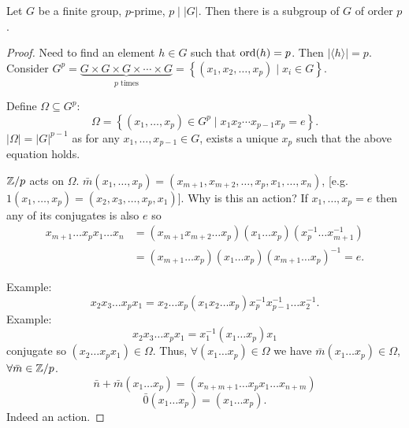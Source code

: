 \documentclass[10pt, a4paper]{article}
\begin{document}
\begin{theorem}[Cauchy]
    Let $G$ be a finite group,
    $p$-prime,
    $p \mid |G|$.
    Then there is a subgroup of $G$ of order $p$.

    \begin{proof}
        Need to find an element $h \in G$ such that $\operatorname{ord}(h) = p$.
        Then $|\langle h \rangle| = p$.
        Consider $G ^ p = \underbrace{G \times G \times G \times \dotsi \times G}_{p\text{ times}} = \left\{(x_1, x_2, \dotsc, x_p) \mid x_i \in G\right\}$.

        Define $\Omega \subseteq G ^ p$:
        \[
        \Omega = \left\{(x_1, \dotsc, x_p) \in G ^ p \mid x_1x_2\dotsi x_{p - 1}x_p = e\right\}.
        \]
        $|\Omega| = |G| ^ {p - 1}$ as for any $x_1, \dotsc, x_{p - 1} \in G$,
        exists a unique $x_p$ such that the above equation holds.

        $\mathbb{Z} / p$ acts on $\Omega$.
        $\bar{m}(x_1, \dotsc, x_p) = (x_{m + 1}, x_{m + 2}, \dotsc, x_p, x_1, \dotsc, x_n)$,
        [e.g. $1(x_1, \dotsc, x_p) = (x_2, x_3, \dotsc, x_p, x_1)$].
        Why is this an action?
        If $x_1, \dotsc, x_p = e$ then any of its conjugates is also $e$ so
        \begin{align*}
            x_{m + 1} \dotsc x_px_1 \dotsc x_n &= (x_{m + 1}x_{m + 2}\dotsc x_p)(x_1 \dotsc x_p)(x_p ^ {-1}\dotsc x_{m + 1}^{-1}) \\
            &= (x_{m + 1}\dotsc x_p)(x_1\dotsc x_p)(x_{m + 1}\dotsc x_p) ^ {-1} = e.
        \end{align*}
        
        Example:
        \[
        x_2x_3 \dotsc x_px_1 = x_2\dotsc x_p(x_1x_2\dotsc x_p)x_p ^ {-1}x_{p - 1}^{-1}\dotsc x_2 ^ {-1}.
        \]
        Example:
        \[
        x_2x_3\dotsc x_px_1 = x_1 ^ {-1}(x_1\dotsc x_p)x_1
        \]
        conjugate so $(x_2\dotsc x_px_1) \in \Omega$.
        Thus,
        $\forall (x_1\dotsc x_p) \in \Omega$ we have $\bar{m}(x_1\dotsc x_p) \in \Omega$,
        $\forall \bar{m} \in \mathbb{Z} / p$.
        \[
        \bar{n} + \bar{m}(x_1\dotsc x_p) = (x_{n + m + 1}\dotsc x_px_1\dotsc x_{n + m})
        \]
        \[
        \bar{0}(x_1\dotsc x_p) = (x_1\dotsc x_p).
        \]
        Indeed an action.
        

\end{proof}
\end{theorem}
\end{document}
